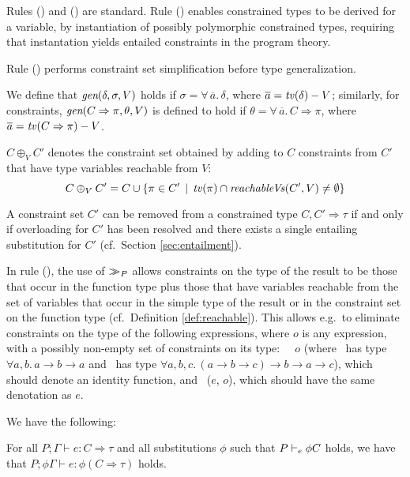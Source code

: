 Rules (\VAR) and (\ABS) are standard. Rule (\VAR) enables constrained
types to be derived for a variable, by instantiation of possibly
polymorphic constrained types, requiring that instantation yields
entailed constraints in the program theory.

Rule (\LET) performs constraint set simplification before type
generalization.

We define that $\mbox{\it gen}(\delta,\sigma,V)$ holds if
$\sigma=\forall\,\overline{a}.\,\delta$, where
$\overline{a}={\it tv\/}(\delta) - V$; similarly, for constraints,
$\mbox{\it gen}(C\Rightarrow\pi,\theta,V)$ is defined to hold if
$\theta=\forall\,\overline{a}.\,C\Rightarrow\pi$, where
$\overline{a}={\it tv\/}(C\Rightarrow\pi) - V$.

$C \oplus_V C'$ denotes the constraint set obtained by adding to $C$
constraints from $C'$ that have type variables reachable from $V$:
  \[ C \oplus_V C' = C \cup \{ \pi \in C'\,\mid\, {\it tv\/}(\pi) \cap {\it reachableVs\/}(C',V) \not= \emptyset \} \]

A constraint set $C'$ can be removed from a constrained type $C,C'
\Rightarrow \tau$ if and only if overloading for $C'$ has been
resolved and there exists a single entailing substitution for $C'$
(cf.~Section \ref{sec:entailment}).

In rule (\APP), the use of $>\!\!\!>_{P}$ allows constraints on the
type of the result to be those that occur in the function type plus
those that have variables reachable from the set of variables that
occur in the simple type of the result or in the constraint set on the
function type (cf.~Definition \ref{def:reachable}).  This allows e.g.~to
eliminate constraints on the type of the following expressions, where
$o$ is any expression, with a possibly non-empty set of constraints on
its type: {\tt \flip\ \const\ $o$} (where \const\ has type $\forall a,
b.\,a \rightarrow b \rightarrow a$ and \flip\ has type $\forall a, b,
c.\,(a \rightarrow b \rightarrow c) \rightarrow b \rightarrow
a\rightarrow c$), which should denote an identity function, and
\fst\ ($e$, $o$), which should have the same denotation as $e$.

We have the following:

\begin{Theorem}[Substituition]
  For all $P;\Gamma \vdash e: C\Rightarrow \tau$ and all substitutions
  $\phi$ such that $P \vdash_e \phi C$ holds, we have that
  $P;\phi\Gamma \vdash e: \phi(C\Rightarrow \tau)$ holds.
 
\label{thm:substitution}
\end{Theorem}

